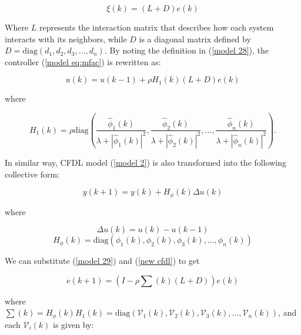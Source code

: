 \documentclass[journal,onecolumn]{IEEEtran}
\begin{document}
\begin{equation}
    \label{model 28}
    \xi(k) = (L + D) e(k)
\end{equation}

Where \(L\) represents the interaction matrix that describes how each system interacts with its neighbors, while \(D\) is a diagonal matrix defined by \(D = \text{diag}(d_1, d_2, d_3, \dots, d_n)\). By noting the definition in (\ref{model 28}), the controller (\ref{model eq:mfac}) is rewritten as:


\begin{equation}
    \label{model 29}
    u(k) = u(k-1) + \rho H_1(k) (L + D) e(k)
\end{equation}

where


\[
H_1(k) = \rho   \text{diag}\left(\frac{\hat{\phi}_1(k)}{\lambda + |\hat{\phi}_1(k)|^2}, \frac{\hat{\phi}_2(k)}{\lambda + |\hat{\phi}_2(k)|^2}, \dots, \frac{\hat{\phi}_n(k)}{\lambda + |\hat{\phi}_n(k)|^2}\right).
\]




In similar way, CFDL model (\ref{model 2}) is also transformed into the following collective form:

\begin{equation}
    \label{new cfdl}
    y(k+1) = y(k) + H_\phi(k) \Delta u(k)
\end{equation}

where

\[\Delta u(k) = u(k)-u(k-1)\]
\[
H_\phi(k) = \text{diag}(\phi_1(k), \phi_2(k), \phi_3(k), \dots, \phi_n(k))
\]


We can substitute (\ref{model 29}) and (\ref{new cfdl}) to get

\begin{equation}
    \label{model 30}
    e(k+1) = (I - \rho \sum(k) (L+D)) e(k)
\end{equation}

where $\sum(k) = H_\phi(k)H_1(k) = \text{diag}(\mathcal{V}_1(k), \mathcal{V}_2(k), \mathcal{V}_3(k), \dots, \mathcal{V}_n(k))$, and each \(\mathcal{V}_i(k)\) is given by:


\end{document}
